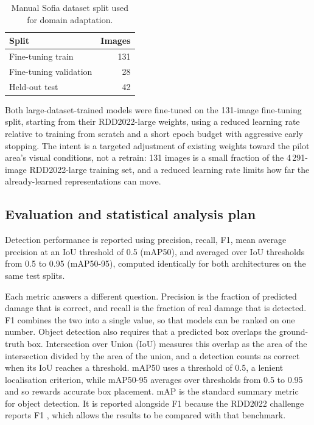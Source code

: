 \documentclass[10pt,a4paper,twocolumn]{article}
\begin{document}
\begin{table}[t]
  \centering
  \small
  \caption{Manual Sofia dataset split used for domain adaptation.}
  \label{tab:sofia-split}
  \begin{tabular}{lr}
    \toprule
    Split & Images \\
    \midrule
    Fine-tuning train & 131 \\
    Fine-tuning validation & 28 \\
    Held-out test & 42 \\
    \bottomrule
  \end{tabular}
\end{table}

Both large-dataset-trained models were fine-tuned on the 131-image
fine-tuning split, starting from their RDD2022-large weights, using a
reduced learning rate relative to training from scratch and a short
epoch budget with aggressive early stopping. The intent is a targeted
adjustment of existing weights toward the pilot area's visual conditions,
not a retrain: 131 images is a small fraction of the 4\,291-image
RDD2022-large training set, and a reduced learning rate limits how far
the already-learned representations can move.

\subsection{Evaluation and statistical analysis plan}
\label{sec:method-evaluation}

Detection performance is reported using precision, recall, F1, mean
average precision at an IoU threshold of 0.5 (mAP50), and averaged over
IoU thresholds from 0.5 to 0.95 (mAP50-95), computed identically for both
architectures on the same test splits.

Each metric answers a different question. Precision is the fraction of
predicted damage that is correct, and recall is the fraction of real damage
that is detected. F1 combines the two into a single value, so that models
can be ranked on one number. Object detection also requires that a predicted
box overlaps the ground-truth box. Intersection over Union (IoU) measures
this overlap as the area of the intersection divided by the area of the
union, and a detection counts as correct when its IoU reaches a threshold.
mAP50 uses a threshold of 0.5, a lenient localisation criterion, while
mAP50-95 averages over thresholds from 0.5 to 0.95 and so rewards accurate
box placement. mAP is the standard summary metric for object detection. It is
reported alongside F1 because the RDD2022 challenge reports F1
\citep{arya2022crddc}, which allows the results to be compared with that
benchmark.
\end{document}

